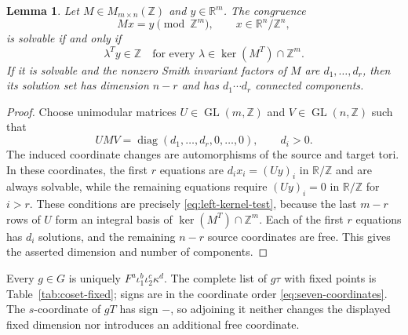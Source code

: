 \documentclass[11pt]{article}
\newtheorem{lemma}[theorem]{Lemma}
\theoremstyle{remark}\newtheorem{remark}[theorem]{Remark}
\newcommand{\R}{\mathbb R}
\newcommand{\Z}{\mathbb Z}
\begin{document}
\begin{lemma}\label{lem:torus-congruence}
Let $M\in M_{m\times n}(\Z)$ and $y\in\R^m$.  The congruence
\[
 Mx=y\pmod{\Z^m},\qquad x\in\R^n/\Z^n,
\]
is solvable if and only if
\begin{equation}\label{eq:left-kernel-test}
 \lambda^Ty\in\Z
 \quad\text{for every }\lambda\in\ker(M^T)\cap\Z^m.
\end{equation}
If it is solvable and the nonzero Smith invariant factors of $M$ are
$d_1,\ldots,d_r$, then its solution set has dimension $n-r$ and has
$d_1\cdots d_r$ connected components.
\end{lemma}
\begin{proof}
Choose unimodular matrices $U\in\operatorname{GL}(m,\Z)$ and
$V\in\operatorname{GL}(n,\Z)$ such that
\[
 UMV=\operatorname{diag}(d_1,\ldots,d_r,0,\ldots,0),
 \qquad d_i>0.
\]
The induced coordinate changes are automorphisms of the source and target
tori.  In these coordinates, the first $r$ equations are
$d_ix_i=(Uy)_i$ in $\R/\Z$ and are always solvable, while the remaining
equations require $(Uy)_i=0$ in $\R/\Z$ for $i>r$.  These conditions are
precisely \eqref{eq:left-kernel-test}, because the last $m-r$ rows of $U$
form an integral basis of $\ker(M^T)\cap\Z^m$.  Each of the first $r$
equations has $d_i$ solutions, and the remaining $n-r$ source coordinates
are free.  This gives the asserted dimension and number of components.
\end{proof}

Every $g\in G$ is uniquely $F^a\iota_1^b\iota_2^c\kappa^d$.  The complete
list of $g\tau$ with fixed points is Table~\ref{tab:coset-fixed}; signs are
in the coordinate order \eqref{eq:seven-coordinates}.  The $s$-coordinate
of $gT$ has sign $-$, so adjoining it neither changes the displayed fixed
dimension nor introduces an additional free coordinate.
\end{document}

